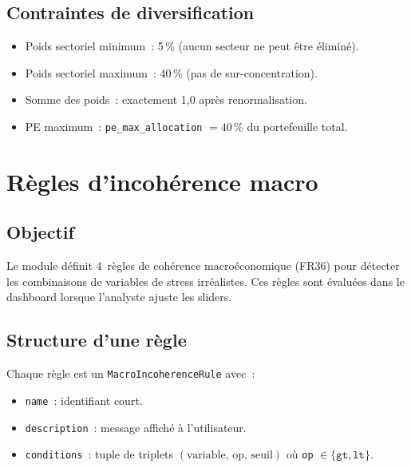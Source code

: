 \documentclass[12pt,a4paper]{article}
\begin{document}
\subsection{Contraintes de diversification}

\begin{itemize}[nosep]
    \item Poids sectoriel minimum~: 5\,\% (aucun secteur ne peut \^etre \'elimin\'e).
    \item Poids sectoriel maximum~: 40\,\% (pas de sur-concentration).
    \item Somme des poids~: exactement 1{,}0 apr\`es renormalisation.
    \item PE maximum~: \texttt{pe\_max\_allocation} $= 40\,\%$ du portefeuille total.
\end{itemize}

\section{R\`egles d'incoh\'erence macro}
\label{sec:incoherence}

\subsection{Objectif}

Le module d\'efinit 4~r\`egles de coh\'erence macro\'economique (FR36) pour d\'etecter les combinaisons de variables de stress irr\'ealistes. Ces r\`egles sont \'evalu\'ees dans le dashboard lorsque l'analyste ajuste les sliders.

\subsection{Structure d'une r\`egle}

Chaque r\`egle est un \texttt{MacroIncoherenceRule} avec~:
\begin{itemize}[nosep]
    \item \texttt{name}~: identifiant court.
    \item \texttt{description}~: message affich\'e \`a l'utilisateur.
    \item \texttt{conditions}~: tuple de triplets $(\text{variable},\, \text{op},\, \text{seuil})$ o\`u \texttt{op} $\in \{\texttt{gt}, \texttt{lt}\}$.
\end{itemize}
\end{document}
